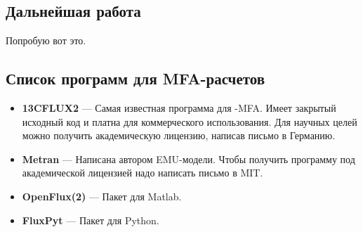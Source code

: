 \documentclass[14pt, a4paper]{extreport}
\begin{document}
\section{Дальнейшая работа}
Попробую вот это.


\begin{appendices}
	\chapter{Список программ для MFA-расчетов}
	\begin{itemize}
		\item \textbf{13CFLUX2} --- Самая известная программа для -MFA. Имеет закрытый исходный код и платна для коммерческого использования. Для научных целей можно получить академическую лицензию, написав письмо в Германию\cite{13CFLUX2}.
		
		\item \textbf{Metran} --- Написана автором EMU-модели. Чтобы получить программу под академической лицензией надо написать письмо в MIT\cite{Metran}.
		
		\item \textbf{OpenFlux(2)} --- Пакет для Matlab\cite{OpenFlux, OpenFlux2}.
		
		\item \textbf{FluxPyt} --- Пакет для Python\cite{FluxPyt}.
	\end{itemize}
	
\end{appendices}
\end{document}
